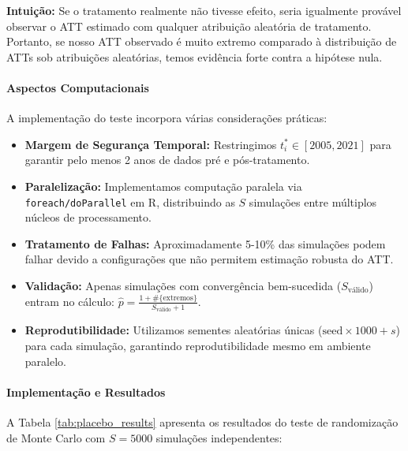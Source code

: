 \documentclass[
	12pt,				%
	oneside,			%
	a4paper,			%
	english,			%
	french,				%
	spanish,			%
	brazil				%
	]{abntex2}
\begin{document}
\textbf{Intuição:} Se o tratamento realmente não tivesse efeito, seria igualmente provável observar o ATT estimado com qualquer atribuição aleatória de tratamento. Portanto, se nosso ATT observado é muito extremo comparado à distribuição de ATTs sob atribuições aleatórias, temos evidência forte contra a hipótese nula.

\paragraph{Aspectos Computacionais}

A implementação do teste incorpora várias considerações práticas:

\begin{itemize}
\item \textbf{Margem de Segurança Temporal:} Restringimos $t_i^* \in [2005, 2021]$ para garantir pelo menos 2 anos de dados pré e pós-tratamento.
\item \textbf{Paralelização:} Implementamos computação paralela via \texttt{foreach/doParallel} em R, distribuindo as $S$ simulações entre múltiplos núcleos de processamento.
\item \textbf{Tratamento de Falhas:} Aproximadamente 5-10\% das simulações podem falhar devido a configurações que não permitem estimação robusta do ATT.
\item \textbf{Validação:} Apenas simulações com convergência bem-sucedida ($S_{\text{válido}}$) entram no cálculo: $\hat{p} = \frac{1 + \#\{\text{extremos}\}}{S_{\text{válido}} + 1}$.
\item \textbf{Reprodutibilidade:} Utilizamos sementes aleatórias únicas ($\text{seed} \times 1000 + s$) para cada simulação, garantindo reprodutibilidade mesmo em ambiente paralelo.
\end{itemize}

\paragraph{Implementação e Resultados}

A Tabela \ref{tab:placebo_results} apresenta os resultados do teste de randomização de Monte Carlo com $S = 5000$ simulações independentes:
\end{document}
